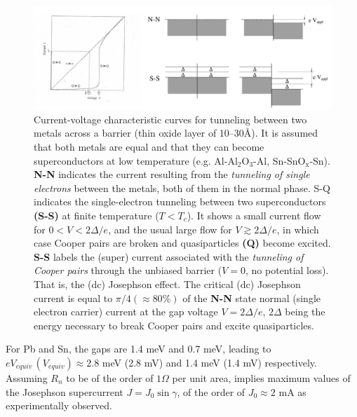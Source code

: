   \begin{figure}
  	\centerline{\includegraphics[width=17cm]{C6/figs_C6/fig4_6_1x}}
  	\caption{Current-voltage characteristic curves for tunneling between two metals across a barrier (thin oxide layer of 10--30\AA). It is assumed that both metals are  equal and that they can become superconductors at low temperature (e.g. Al-Al$_2$O$_3$-Al, Sn-SnO$_\text{x}$-Sn). \textbf{N-N} indicates the  current resulting from the \textit{tunneling of single electrons} between the metals, both of them in the normal phase. S-Q indicates the single-electron tunneling between two superconductors \textbf{(S-S)} at finite temperature ($T<T_c$). It shows a small current flow for $0<V<2\Delta/e$, and the usual large flow for $V\gtrsim2\Delta/e$, in which case Cooper pairs are broken and quasiparticles \textbf{(Q)} become excited. \textbf{S-S} labels the (super) current associated with the \textit{tunneling of Cooper pairs} through the unbiased barrier ($V=0$, no potential loss). That is, the (dc) Josephson effect. The critical (dc) Josephson current  is equal to $\pi/4(\approx80\%)$ of the \textbf{N-N} state normal (single electron carrier) current at the gap voltage $V=2\Delta/e$, $2\Delta$ being the energy necessary to break Cooper pairs and excite quasiparticles.}\label{fig4.6.1}
  \end{figure}
  
  For Pb and Sn, the gaps are 1.4 meV and 0.7 meV, leading to $e V_{equiv} \,(V_{equiv})\approx 2.8$ meV (2.8 mV) and 1.4 meV (1.4 mV) respectively. Assuming $R_n$ to be of the order of $1\Omega$ per unit area, implies maximum values of the Josephson supercurrent $J=J_0\sin\gamma$, of the order of $J_0\approx 2$ mA as experimentally observed.
 
